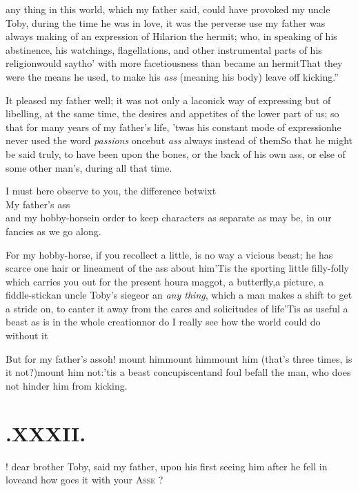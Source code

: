 \documentclass{article}
\begin{document}
 any thing in this world, which my\break
father said, could have provoked my uncle Toby, during the
time he was in love, it was the perverse use my father was always
making of an expression of Hilarion the hermit; who, in
speaking of his abstinence, his watchings, flagellations, and other
instrumental parts of his religion\tsk would say\tsk tho’
with more facetiousness than became an
hermit\tsk \lqq That they were the means he used, to make
his \textit{ass} (meaning his body) leave off
kicking.”

It pleased my father well; it was not only a laconick way of
expressing\tsh\break
but of libelling, at the same time, the desires and appetites of
the lower part of us; so that for many years of my father’s
life, ’twas his constant mode of expression\tsk he never used
the word \textit{passions} once\tsk but \textit{ass} always
instead of them\tsh So that he might be said truly, to have been
upon the bones, or the back of his own ass, or else of some
other man’s, during all that time.

I must here observe to you, the difference betwixt\\
\null\qquad My father’s ass\\
\null\qquad and my hobby-horse\tsk in order to keep
characters as separate as may be, in our fancies as we go
along.

For my hobby-horse, if you recollect a little, is no way a
vicious beast; he has scarce one hair or lineament of the ass about
him\tsh ’Tis the sporting little filly-folly which
carries you out for the present hour\tsk a
maggot, a butterfly,\break a
picture, a fiddle-stick\tsk an uncle Toby’s
siege\tsk or an \textit{any thing}, which a man makes a shift to
get a stride on, to canter it away from the cares and solicitudes
of life\tsk ’Tis as useful a beast as is in the whole
creation\tsk nor do I really see how the world could do without
it\tsh

\noindent
\tsh But for my father’s ass\tsh oh!
mount him\tsk mount him\tsk mount him\tsk \break
(that’s three times, is it not?)\tsk mount him not:\tsk ’tis a beast
concupiscent\tsk and foul befall the man, who does not hinder him
from kicking.

\vfill{}\eject\null
\section{.\enspace XXXII.}

! dear brother Toby, said\break
my father, upon his first seeing him after he fell in
love\tsk and how goes it with your \textsc{Asse} ?
\end{document}
